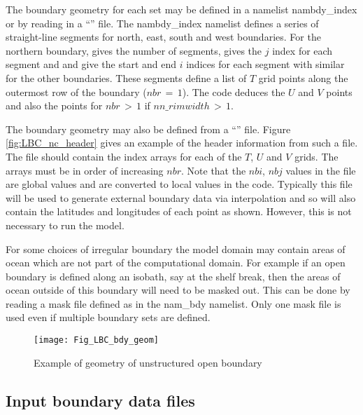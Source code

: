 \documentclass[../tex_main/NEMO_manual]{subfiles}
\begin{document}
The boundary geometry for each set may be defined in a namelist
nambdy\_index or by reading in a ``'' file. The
nambdy\_index namelist defines a series of straight-line segments for
north, east, south and west boundaries. For the northern boundary,
 gives the number of segments,  gives the $j$
index for each segment and  and  give the start
and end $i$ indices for each segment with similar for the other
boundaries. These segments define a list of $T$ grid points along the
outermost row of the boundary ($nbr\,=\, 1$). The code deduces the $U$ and
$V$ points and also the points for $nbr\,>\, 1$ if
$nn\_rimwidth\,>\,1$.

The boundary geometry may also be defined from a
``'' file. Figure \autoref{fig:LBC_nc_header}
gives an example of the header information from such a file. The file
should contain the index arrays for each of the $T$, $U$ and $V$
grids. The arrays must be in order of increasing $nbr$. Note that the
$nbi$, $nbj$ values in the file are global values and are converted to
local values in the code. Typically this file will be used to generate
external boundary data via interpolation and so will also contain the
latitudes and longitudes of each point as shown. However, this is not
necessary to run the model. 

For some choices of irregular boundary the model domain may contain
areas of ocean which are not part of the computational domain. For
example if an open boundary is defined along an isobath, say at the
shelf break, then the areas of ocean outside of this boundary will
need to be masked out. This can be done by reading a mask file defined
as  in the nam\_bdy namelist. Only one mask file is
used even if multiple boundary sets are defined.

\begin{figure}[!t]      \begin{center}
\texttt{[image: Fig\_LBC\_bdy\_geom]}
\caption {      \protect\label{fig:LBC_bdy_geom}
Example of geometry of unstructured open boundary}
\end{center}   \end{figure}

\subsection{Input boundary data files}
\label{subsec:BDY_data}
\end{document}
